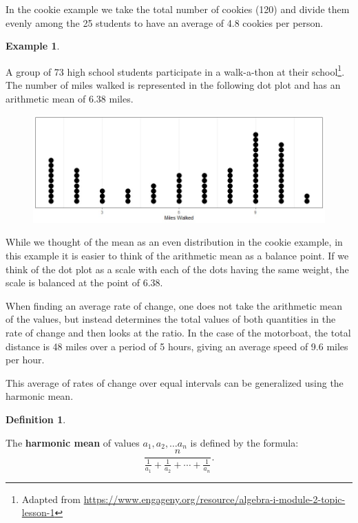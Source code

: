 \documentclass[
]{book}
\theoremstyle{definition}
\newtheorem{definition}{Definition}[chapter]
\theoremstyle{definition}
\newtheorem{example}{Example}[chapter]
\theoremstyle{definition}
\theoremstyle{definition}
\theoremstyle{remark}
\begin{document}
In the cookie example we take the total number of cookies (120) and divide them evenly among the 25 students to have an average of 4.8 cookies per person.

\begin{example}
\protect\hypertarget{exm:unlabeled-div-292}{}\label{exm:unlabeled-div-292}

A group of 73 high school students participate in a walk-a-thon at their school\footnote{Adapted from \url{https://www.engageny.org/resource/algebra-i-module-2-topic-lesson-1}}. The number of miles walked is represented in the following dot plot and has an arithmetic mean of 6.38 miles.

\begin{figure}

{\centering \includegraphics[width=0.8\linewidth]{images/walkathon_dotplot} 

}

\end{figure}

While we thought of the mean as an even distribution in the cookie example, in this example it is easier to think of the arithmetic mean as a balance point. If we think of the dot plot as a scale with each of the dots having the same weight, the scale is balanced at the point of 6.38.

\end{example}

When finding an average rate of change, one does not take the arithmetic mean of the values, but instead determines the total values of both quantities in the rate of change and then looks at the ratio. In the case of the motorboat, the total distance is 48 miles over a period of 5 hours, giving an average speed of 9.6 miles per hour.

This average of rates of change over equal intervals can be generalized using the harmonic mean.

\begin{definition}
\protect\hypertarget{def:unlabeled-div-293}{}\label{def:unlabeled-div-293}

The \textbf{harmonic mean} of values \(a_1, a_2, \ldots a_n\) is defined by the formula:
\[\frac{n}{\frac{1}{a_1} + \frac{1}{a_2} + \cdots + \frac{1}{a_n}}.\]

\end{definition}
\end{document}
